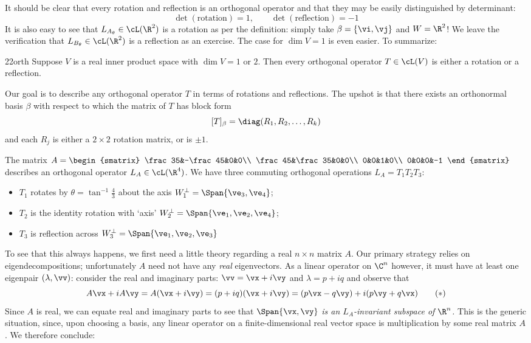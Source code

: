 It should be clear that every rotation and reflection is an orthogonal operator and that they may be easily distinguished by determinant:
\[\det(\text{rotation})=1,\qquad \det(\text{reflection})=-1\]
It is also easy to see that $L_{A_\theta}\in\cL(\R^2)$ is a rotation as per the definition: simply take $\beta=\{\vi,\vj\}$ and $W=\R^2$! We leave the verification that $L_{B_\theta}\in\cL(\R^2)$ is a reflection as an exercise. The case for $\dim V=1$ is even easier. To summarize:

\begin{lemm}{}{22orth}
Suppose $V$ is a real inner product space with $\dim V=1$ or $2$. Then every orthogonal operator $T\in\cL(V)$ is either a rotation or a reflection.
\end{lemm}


Our goal is to describe any orthogonal operator $T$ in terms of rotations and reflections. The upshot is that there exists an orthonormal basis $\beta$ with respect to which the matrix of $T$ has block form
\[[T]_\beta=\diag(R_1,R_2,\ldots,R_k)\]
and each $R_j$ is either a $2\times 2$ rotation matrix, or is $\pm 1$.

\begin{example}{}{}
The matrix $A=\begin{smatrix}
\frac 35&-\frac 45&0&0\\
\frac 45&\frac 35&0&0\\
0&0&1&0\\
0&0&0&-1
\end{smatrix}$ describes an orthogonal operator $L_A\in\cL(\R^4)$. We have three commuting orthogonal operations $L_A=T_1T_2T_3$:
\begin{itemize}
  \item $T_1$ rotates by $\theta=\tan^{-1}\frac 43$ about the axis $W_1^\perp=\Span\{\ve_3,\ve_4\}$;
  \item $T_2$ is the identity rotation with `axis' $W_2^\perp=\Span\{\ve_1,\ve_2,\ve_4\}$;
  \item $T_3$ is reflection across $W_3^\perp=\Span\{\ve_1,\ve_2,\ve_3\}$
\end{itemize}
\end{example}

To see that this always happens, we first need a little theory regarding a real $n\times n$ matrix $A$. Our primary strategy relies on eigendecompositions; unfortunately $A$ need not have any \emph{real} eigenvectors. As a linear operator on $\C^n$ however, it must have at least one eigenpair $(\lambda,\vv)$: consider the real and imaginary parts: $\vv=\vx+i\vy$ and $\lambda=p+iq$ and observe that
\[A\vx+iA\vy=A(\vx+i\vy)=(p+iq)(\vx+i\vy)=(p\vx-q\vy)+i(p\vy+q\vx) \tag{$\ast$}\]
Since $A$ is real, we can equate real and imaginary parts to see that $\Span\{\vx,\vy\}$ \emph{is an $L_A$-invariant subspace of $\R^n$.} This is the generic situation, since, upon choosing a basis, any linear operator on a finite-dimensional real vector space is multiplication by some real matrix $A$. We therefore conclude:

